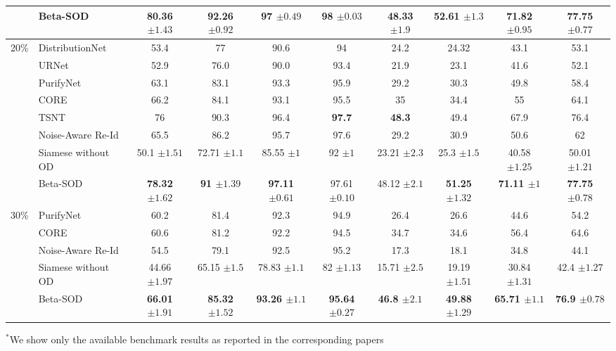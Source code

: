 \documentclass[lettersize,journal]{IEEEtran}
\begin{document}
\begin{table}[ht]
{\begin{tabular}{c|l|cccc|cccc}
 & Beta-SOD & \textbf{80.36 $\pm1.43$} & \textbf{92.26 $\pm0.92$} & \textbf{97 $\pm0.49$} & \textbf{98 $\pm0.03$} & \textbf{48.33 $\pm1.9$} & \textbf{52.61 $\pm1.3$} & \textbf{71.82 $\pm0.95$} & \textbf{77.75 $\pm0.77$} \\ \hline
\multirow{8}{*}{20\%} & DistributionNet & 53.4 & 77 & 90.6 & 94 & 24.2 & 24.32 & 43.1 & 53.1 \\
 & URNet & 52.9 & 76.0 & 90.0 & 93.4 & 21.9 & 23.1 & 41.6 & 52.1 \\
 & PurifyNet & 63.1 & 83.1 & 93.3 & 95.9 & 29.2 & 30.3 & 49.8 & 58.4 \\
 & CORE & 66.2 & 84.1 & 93.1 & 95.5 & 35 & 34.4 & 55 & 64.1 \\
 & TSNT & 76 & 90.3 & 96.4 & \textbf{97.7} & \textbf{48.3} & 49.4 & 67.9 & 76.4 \\
 & Noise-Aware Re-Id & 65.5 & 86.2 & 95.7 & 97.6 & 29.2 & 30.9 & 50.6 & 62 \\ \cline{2-10} 
 & Siamese without OD & 50.1 $\pm1.51$ & 72.71 $\pm1.1$ & 85.55 $\pm1$ & 92 $\pm1$ & 23.21 $\pm2.3$ & 25.3 $\pm1.5$ & 40.58 $\pm1.25$ & 50.01 $\pm1.21$ \\
 & Beta-SOD & \textbf{78.32 $\pm1.62$} & \textbf{91 $\pm1.39$} & \textbf{97.11 $\pm0.61$} & 97.61 $\pm0.10$ & 48.12 $\pm2.1$ & \textbf{51.25 $\pm1.32$} & \textbf{71.11 $\pm1$} & \textbf{77.75 $\pm0.78$} \\ \hline
\multirow{5}{*}{30\%} & PurifyNet & 60.2 & 81.4 & 92.3 & 94.9 & 26.4 & 26.6 & 44.6 & 54.2 \\
 & CORE & 60.6 & 81.2 & 92.2 & 94.5 & 34.7 & 34.6 & 56.4 & 64.6 \\
 & Noise-Aware Re-Id & 54.5 & 79.1 & 92.5 & 95.2 & 17.3 & 18.1 & 34.8 & 44.1 \\ \cline{2-10} 
 & Siamese without OD & 44.66 $\pm1.97$ & 65.15 $\pm1.5$ & 78.83 $\pm1.1$ & 82 $\pm1.13$ & 15.71 $\pm2.5$ & 19.19 $\pm1.51$ & 30.84 $\pm1.31$ & 42.4 $\pm1.27$ \\
 & Beta-SOD & \textbf{66.01 $\pm1.91$} & \textbf{85.32 $\pm1.52$} & \textbf{93.26 $\pm1.1$} & \textbf{95.64 $\pm0.27$} & \textbf{46.8 $\pm2.1$} & \textbf{49.88 $\pm1.29$} & \textbf{65.71 $\pm1.1$} & \textbf{76.9 $\pm0.78$} \\ \hline
\end{tabular}}
{\noindent \small \qquad $^*$We show only the available benchmark results as reported in the corresponding papers}
\label{table:person_ReId}
\end{table}
\end{document}
